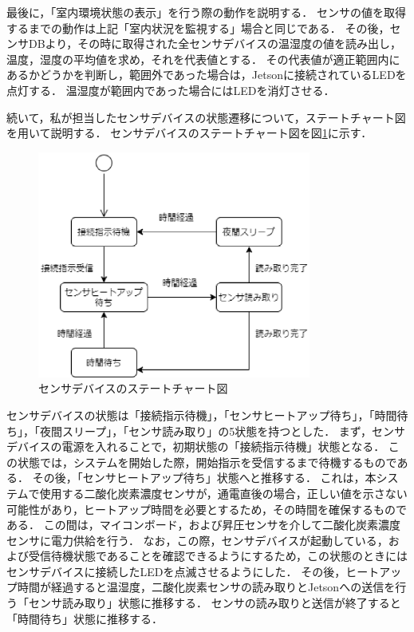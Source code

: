 最後に，「室内環境状態の表示」を行う際の動作を説明する．
センサの値を取得するまでの動作は上記「室内状況を監視する」場合と同じである．
その後，センサDBより，その時に取得された全センサデバイスの温湿度の値を読み出し，温度，湿度の平均値を求め，それを代表値とする．
その代表値が適正範囲内にあるかどうかを判断し，範囲外であった場合は，Jetsonに接続されているLEDを点灯する．
温湿度が範囲内であった場合にはLEDを消灯させる．

続いて，私が担当したセンサデバイスの状態遷移について，ステートチャート図を用いて説明する．
センサデバイスのステートチャート図を図\ref{state_sensor}に示す．
\begin{figure}[htbp]
    \centering
    \includegraphics[width = 9cm]{./picture/statechart_micon.eps}
    \caption{センサデバイスのステートチャート図}
    \label{state_sensor}
\end{figure}
センサデバイスの状態は「接続指示待機」，「センサヒートアップ待ち」，「時間待ち」，「夜間スリープ」，「センサ読み取り」の5状態を持つとした．
まず，センサデバイスの電源を入れることで，初期状態の「接続指示待機」状態となる．
この状態では，システムを開始した際，開始指示を受信するまで待機するものである．
その後，「センサヒートアップ待ち」状態へと推移する．
これは，本システムで使用する二酸化炭素濃度センサが，通電直後の場合，正しい値を示さない可能性があり，ヒートアップ時間を必要とするため，その時間を確保するものである．
この間は，マイコンボード，および昇圧センサを介して二酸化炭素濃度センサに電力供給を行う．
なお，この際，センサデバイスが起動している，および受信待機状態であることを確認できるようにするため，この状態のときにはセンサデバイスに接続したLEDを点滅させるようにした．
その後，ヒートアップ時間が経過すると温湿度，二酸化炭素センサの読み取りとJetsonへの送信を行う「センサ読み取り」状態に推移する．
センサの読み取りと送信が終了すると「時間待ち」状態に推移する．
